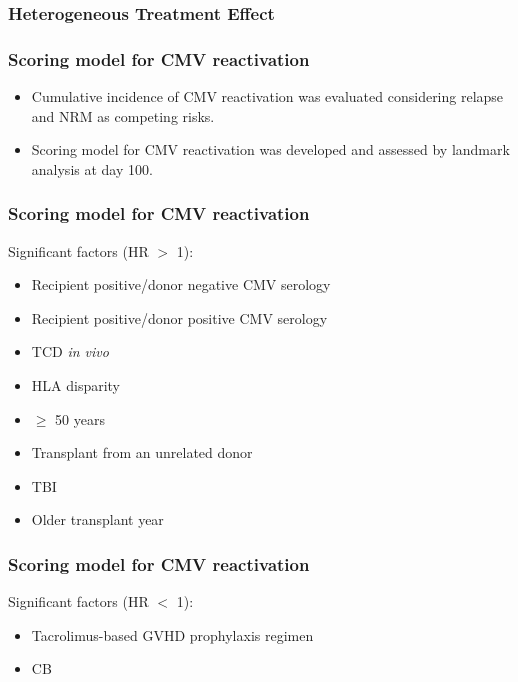 \documentclass[aspectratio=169, 12pt]{beamer}
\begin{document}
	\begin{frame}
	\frametitle{Heterogeneous Treatment Effect}
	\end{frame}

	\begin{frame}
	\frametitle{Scoring model for CMV reactivation}
	\begin{itemize}
	\item Cumulative incidence of CMV reactivation was evaluated considering relapse and NRM as competing risks.
	\item Scoring model for CMV reactivation was developed and assessed by landmark analysis at day 100.

	\end{itemize}
	\end{frame}

	\begin{frame}
	\frametitle{Scoring model for CMV reactivation}
	Significant factors (HR $>$ 1):
	\begin{itemize}
	\item Recipient positive/donor negative CMV serology
	\item Recipient positive/donor positive CMV serology
	\item TCD {\it in vivo}
	\item HLA disparity
	\item $\geq$ 50 years
	\item Transplant from an unrelated donor
	\item TBI
	\item Older transplant year

	\end{itemize}
	\end{frame}

	\begin{frame}
	\frametitle{Scoring model for CMV reactivation}
	Significant factors (HR $<$ 1):
	\begin{itemize}
	\item Tacrolimus-based GVHD prophylaxis regimen
	\item CB

	\end{itemize}
	\end{frame}
\end{document}
